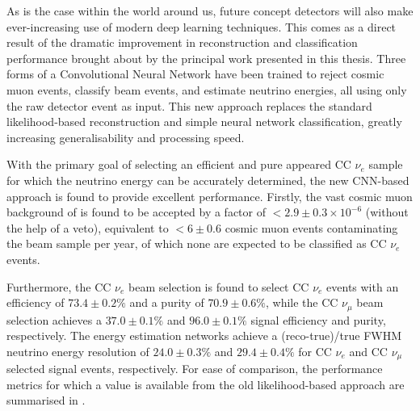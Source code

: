 As is the case within the world around us, future \chips concept detectors will also make
ever-increasing use of modern deep learning techniques. This comes as a direct result of the
dramatic improvement in \chipsfive reconstruction and classification performance brought about by
the principal work presented in this thesis. Three forms of a Convolutional Neural Network have
been trained to reject cosmic muon events, classify beam events, and estimate neutrino energies,
all using only the raw detector event as input. This new approach replaces the standard
likelihood-based reconstruction and simple neural network classification, greatly increasing
generalisability and processing speed.

With the primary goal of selecting an efficient and pure appeared CC $\nu_{e}$ sample for which
the neutrino energy can be accurately determined, the new CNN-based approach is found to provide
excellent performance. Firstly, the vast cosmic muon background of \chipsfive is found to be
accepted by a factor of $<2.9\pm0.3\times10^{-6}$ (without the help of a veto), equivalent to
$<6\pm0.6$ cosmic muon events contaminating the beam sample per year, of which none are expected
to be classified as CC $\nu_{e}$ events.

Furthermore, the CC $\nu_{e}$ beam selection is found to select CC $\nu_{e}$ events with an
efficiency of $73.4\pm0.2\%$ and a purity of $70.9\pm0.6\%$, while the CC $\nu_{\mu}$ beam
selection achieves a $37.0\pm0.1\%$ and $96.0\pm0.1\%$ signal efficiency and purity, respectively.
The energy estimation networks achieve a (reco-true)/true FWHM neutrino energy resolution of
$24.0\pm0.3\%$ and $29.4\pm0.4\%$ for CC $\nu_{e}$ and CC $\nu_{\mu}$ selected signal events,
respectively. For ease of comparison, the performance metrics for which a value is available from
the old likelihood-based approach are summarised in .


